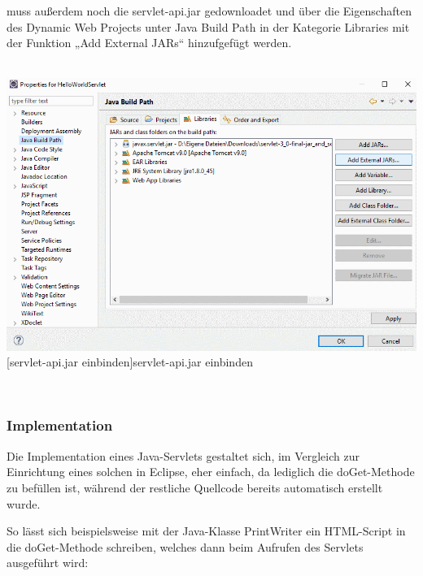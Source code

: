\documentclass[12pt,a4paper,bibliography=totocnumbered,listof=totocnumbered]{scrartcl}
\begin{document}
muss außerdem noch die servlet-api.jar gedownloadet und über die Eigenschaften des Dynamic Web Projects unter Java Build Path in der Kategorie Libraries mit der Funktion „Add External JARs“ hinzufgefügt werden.\\
\\
\vspace{1em}
\begin{minipage}{\linewidth}
	\centering
	\includegraphics[width=0.9\linewidth]{Bilder/Eclipse-ServerErstellen4.png}
	[servlet-api.jar einbinden]{servlet-api.jar einbinden}	
	\label{fig:eclipse5}
\end{minipage}
\\
 

\subsubsection{Implementation}
Die Implementation eines Java-Servlets gestaltet sich, im Vergleich zur Einrichtung eines solchen in Eclipse, eher einfach, da lediglich die doGet-Methode zu befüllen ist, während der restliche Quellcode bereits automatisch erstellt wurde.

So lässt sich beispielsweise mit der Java-Klasse PrintWriter ein HTML-Script in die doGet-Methode schreiben, welches dann beim Aufrufen des Servlets ausgeführt wird:

\end{document}
